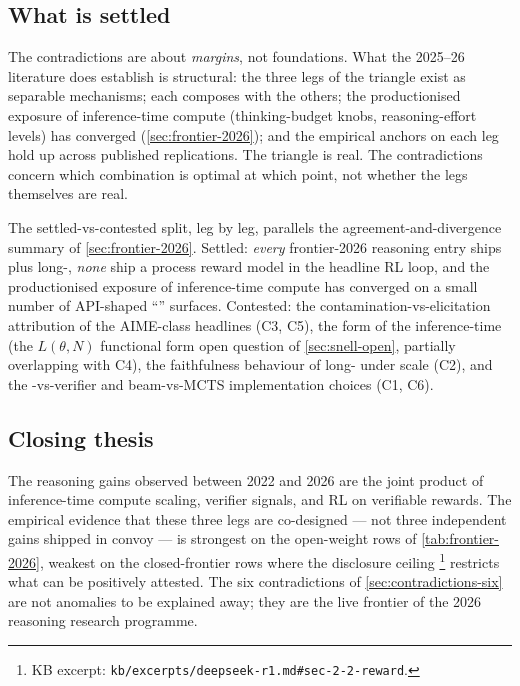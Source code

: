 \subsection{What is settled}
\label{sec:contradictions-settled}

\begin{intuition}
The contradictions are about \emph{margins}, not foundations. What
the 2025--26 literature does establish is structural: the three legs
of the triangle exist as separable mechanisms; each composes with the
others; the productionised exposure of inference-time compute
(thinking-budget knobs, reasoning-effort levels) has converged
(\cref{sec:frontier-2026}); and the empirical anchors on each leg
\citep{snell2024,lightman2023-prm800k,shao2024,deepseek-r1,dapo2025,s1-2025}
hold up across published replications. The triangle is real. The
contradictions concern which combination is optimal at which point, not
whether the legs themselves are real.
\end{intuition}

The settled-vs-contested split, leg by leg, parallels the
agreement-and-divergence summary of
\cref{sec:frontier-2026}. Settled: \emph{every} frontier-2026 reasoning
entry ships  plus long-, \emph{none} ship a process reward
model in the headline RL loop, and the productionised exposure of
inference-time compute has converged on a small number of API-shaped
``'' surfaces. Contested: the contamination-vs-elicitation
attribution of the AIME-class headlines (C3, C5), the form of the
inference-time  (the $L(\theta, N)$ functional form open
question of \cref{sec:snell-open}, partially overlapping with C4), the
faithfulness behaviour of long- under scale (C2), and the
-vs-verifier and beam-vs-MCTS implementation choices (C1, C6).

\subsection{Closing thesis}
\label{sec:contradictions-closing}

The reasoning gains observed between 2022 and 2026 are the joint
product of inference-time compute scaling, verifier signals, and RL on
verifiable rewards. The empirical evidence that these three legs are
co-designed --- not three independent gains shipped in convoy --- is
strongest on the open-weight rows of \cref{tab:frontier-2026},
weakest on the closed-frontier rows where the disclosure ceiling
\citep[\S 2.2]{deepseek-r1}\footnote{KB excerpt:
\texttt{kb/excerpts/deepseek-r1.md\#sec-2-2-reward}.} restricts what
can be positively attested. The six contradictions of
\cref{sec:contradictions-six} are not anomalies to be explained away;
they are the live frontier of the 2026 reasoning research programme.

